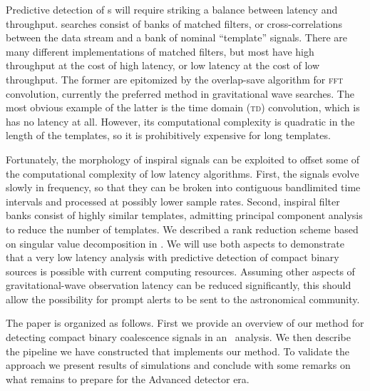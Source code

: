 Predictive detection of \CBC{}s will require striking a balance between latency and throughput.  \CBC{} searches consist of banks of matched filters, or cross-correlations between the data stream and a bank of nominal ``template'' signals.  There are many different implementations of matched filters, but most have high throughput at the cost of high latency, or low latency at the cost of low throughput.  The former are epitomized by the overlap-save algorithm for \textsc{fft} convolution, currently the preferred method in gravitational wave searches.  The most obvious example of the latter is the time domain (\textsc{td}) convolution, which is has no latency at all.  However, its computational complexity is quadratic in the length of the templates, so it is prohibitively expensive for long templates.

Fortunately, the morphology of inspiral signals can be exploited to offset some of the computational complexity of low latency algorithms.  First, the signals evolve slowly in frequency, so that they can be broken into contiguous bandlimited time intervals and processed at possibly lower sample rates.  Second, inspiral filter banks consist of highly similar templates, admitting principal component analysis to reduce the number of templates.  We described a rank reduction scheme based on singular value decomposition in \cite{Cannon:2010p10398}.  We will use both aspects to demonstrate that a very low latency analysis with predictive detection of compact binary sources is possible with current computing resources.  Assuming other aspects of gravitational-wave observation latency
can be reduced significantly, this should allow the possibility for prompt
alerts to be sent to the astronomical community.

The paper is organized as follows. First we provide an overview of our method
for detecting compact binary coalescence signals in an \earlywarning\
analysis. We then describe the pipeline we have constructed that implements
our method.  To validate the approach we present results of simulations and
conclude with some remarks on what remains to prepare for the Advanced
detector era.


